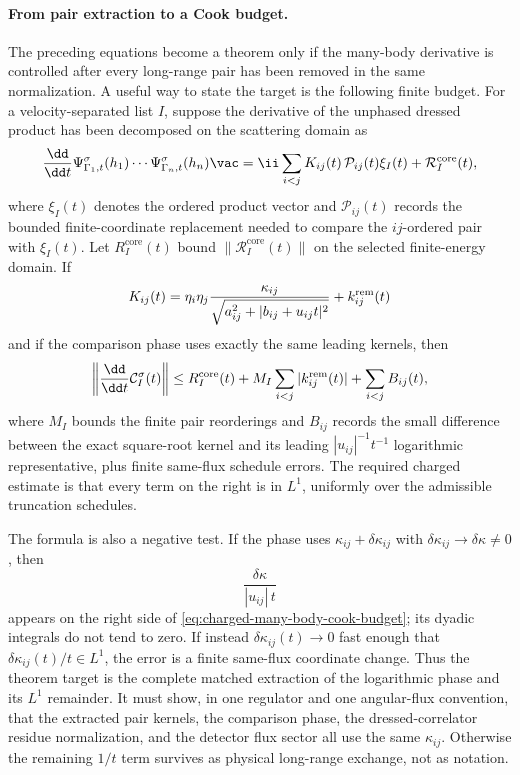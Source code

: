 \paragraph{From pair extraction to a Cook budget.}
The preceding equations become a theorem only if the many-body derivative is
controlled after every long-range pair has been removed in the same
normalization.  A useful way to state the target is the following finite
budget.  For a velocity-separated list \(I\), suppose the derivative of the
unphased dressed product has been decomposed on the scattering domain as
\begin{equation}
  \frac{\dd}{\dd t}
  \Psi_{\Gamma_1,t}^{\sigma}(h_1)\cdots
  \Psi_{\Gamma_n,t}^{\sigma}(h_n)\vac
  =
  \ii\sum_{i<j}K_{ij}(t)\,
  \mathcal P_{ij}(t)\xi_I(t)
  +
  \mathcal R_I^{\mathrm{core}}(t),
  \label{eq:charged-many-body-pair-extracted-derivative}
\end{equation}
where \(\xi_I(t)\) denotes the ordered product vector and
\(\mathcal P_{ij}(t)\) records the bounded finite-coordinate replacement
needed to compare the \(ij\)-ordered pair with \(\xi_I(t)\).  Let
\(R_I^{\mathrm{core}}(t)\) bound
\(\|\mathcal R_I^{\mathrm{core}}(t)\|\) on the selected finite-energy
domain.  If
\[
  K_{ij}(t)
  =
  \eta_i\eta_j
  \frac{\kappa_{ij}}{\sqrt{a_{ij}^2+|b_{ij}+u_{ij}t|^2}}
  +
  k_{ij}^{\rm rem}(t)
\]
and if the comparison phase uses exactly the same leading kernels, then
\begin{equation}
  \left\|
  \frac{\dd}{\dd t}\mathcal C_I^\sigma(t)
  \right\|
  \le
  R_I^{\mathrm{core}}(t)
  +
  M_I\sum_{i<j}|k_{ij}^{\rm rem}(t)|
  +
  \sum_{i<j}B_{ij}(t),
  \label{eq:charged-many-body-cook-budget}
\end{equation}
where \(M_I\) bounds the finite pair reorderings and \(B_{ij}\) records the
small difference between the exact square-root kernel and its leading
\(|u_{ij}|^{-1}t^{-1}\) logarithmic representative, plus finite
same-flux schedule errors.  The required charged estimate is that every term
on the right is in \(L^1\), uniformly over the admissible truncation
schedules.

The formula is also a negative test.  If the phase uses
\(\kappa_{ij}+\delta\kappa_{ij}\) with
\(\delta\kappa_{ij}\to\delta\kappa\neq0\), then
\[
  \frac{\delta\kappa}{|u_{ij}|\,t}
\]
appears on the right side of
\eqref{eq:charged-many-body-cook-budget}; its dyadic integrals do not tend to
zero.  If instead \(\delta\kappa_{ij}(t)\to0\) fast enough that
\(\delta\kappa_{ij}(t)/t\in L^1\), the error is a finite same-flux coordinate
change.  Thus the theorem target is the complete matched extraction of the
logarithmic phase and its \(L^1\) remainder.
It must show, in one regulator and one angular-flux convention, that the
extracted pair kernels, the comparison phase, the dressed-correlator residue
normalization, and the detector flux sector all use the same
\(\kappa_{ij}\).  Otherwise the remaining \(1/t\) term survives as physical
long-range exchange, not as notation.

